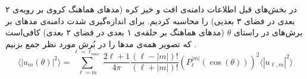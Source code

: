 



در بخش‌های قبل اطلاعات دامنه‌ی افت و خیز کره (مد‌های هماهنگ کروی بر رویه‌ی ۲ بعدی در فضای ۳ بعدیی) را محاسبه‌ کردیم. برای اندازه‌گیری شدت دامنه‌ی مد‌های بر برش‌های در راستای 
$\theta$
(مد‌های هماهنگ بر حلقه‌ی ۱ بعدی در فضای ۲ بعدی) کافی‌است که  تصویر همه‌ی مد‌ها را در بُرش مورد نظر جمع بزنیم
\cite{Prost2004}
.
\begin{equation}
\langle|u_m(\theta)|^2\rangle=\sum_{\ell=m}^{\ell=\ell_{max}}\frac{2\ell+1}{4\pi}\frac{(\ell-|m|)!}{(\ell+|m|)!}\left(P_\ell^{|m|}(\cos(\theta))\right)^2\langle|u_{\ell,m}|^2\rangle
\label{eq:3Dto2Dsum}
\end{equation}
